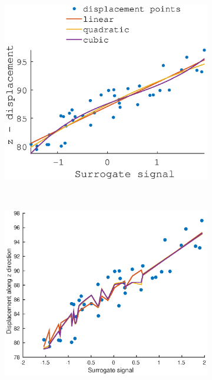 \documentclass[11pt,a4paper,oneside]{report}
\begin{document}
\begin{figure}
    \hspace*{-2em}
  \begin{subfigure}[b]{0.33\textwidth}
    \includegraphics[width=\textwidth, trim=0 0 0 110,clip=true]{figures/task2/fit_round1_couch4.eps}
  \end{subfigure}%
    ~ %
  \begin{subfigure}[b]{0.33\textwidth}
    \includegraphics[width=\textwidth, trim=0 0 0 110,clip=true]{figures/task2/fit_round2_couch4.eps}

\end{subfigure}
\end{figure}
\end{document}
